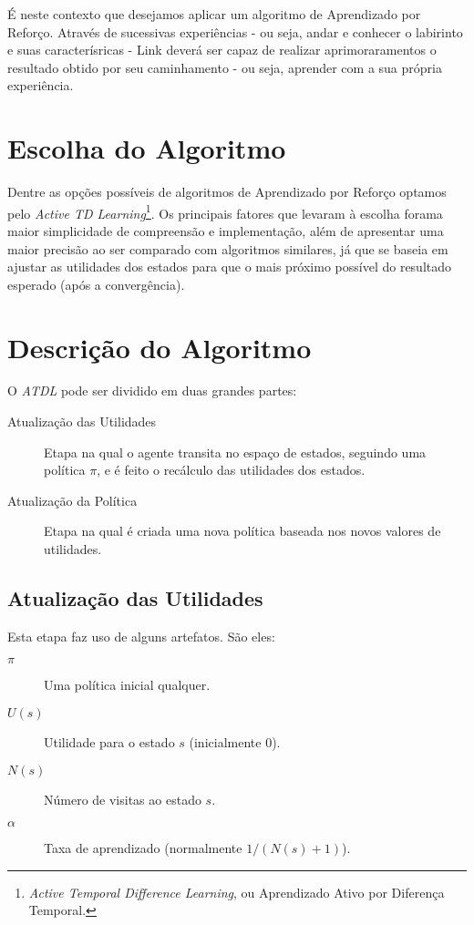 \documentclass[letterpaper]{article}
\begin{document}
É neste contexto que desejamos aplicar um algoritmo de Aprendizado por Reforço. Através de
sucessivas experiências - ou seja, andar e conhecer o labirinto e suas caracterísricas - Link
deverá ser capaz de realizar aprimoraramentos o resultado obtido por seu caminhamento - ou seja,
aprender com a sua própria experiência.

\section{Escolha do Algoritmo}

Dentre as opções possíveis de algoritmos de Aprendizado por Reforço optamos pelo
\textit{Active TD Learning}\footnote{\textit{Active Temporal Difference Learning}, ou Aprendizado
Ativo por Diferença Temporal.}. Os principais fatores que levaram à escolha forama maior
simplicidade de compreensão e implementação, além de apresentar uma maior precisão ao ser
comparado com algoritmos similares, já que se baseia em ajustar as utilidades dos estados para
que o mais próximo possível do resultado esperado (após a convergência).

\section{Descrição do Algoritmo}

O \textit{ATDL} pode ser dividido em duas grandes partes:

\begin{description}
\item[Atualização das Utilidades] Etapa na qual o agente transita no espaço de estados,
seguindo uma política $\pi$, e é feito o recálculo das utilidades dos estados.
\item[Atualização da Política] Etapa na qual é criada uma nova política baseada nos
novos valores de utilidades.
\end{description}

\subsection{Atualização das Utilidades}

Esta etapa faz uso de alguns artefatos. São eles:

\begin{description}
\item[$\pi$] Uma política inicial qualquer.
\item[$U(s)$] Utilidade para o estado $s$ (inicialmente $0$).
\item[$N(s)$] Número de visitas ao estado $s$.
\item[$\alpha$] Taxa de aprendizado (normalmente $1/(N(s)+1)$).
\end{description}
\end{document}

